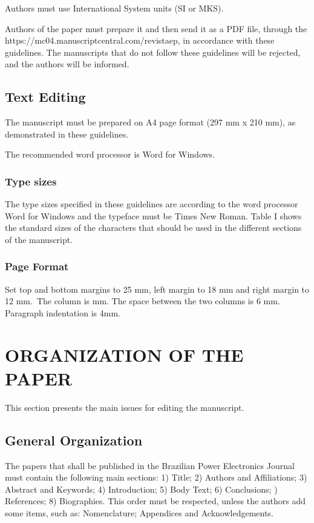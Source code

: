 \documentclass[english]{sobraep}
\begin{document}
Authors must use International System units (SI or MKS).

Authors of the paper must prepare it and then send it as a PDF file, through the https://mc04.manuscriptcentral.com/revistaep, in accordance with these guidelines. The manuscripts that do not follow these guidelines will be rejected, and the authors will be informed.

\subsection{Text Editing}
The manuscript must be prepared on A4 page format \linebreak (297 mm x 210 mm), as demonstrated in these guidelines.

The recommended word processor is Word for Windows.

\subsubsection{Type sizes} The type sizes specified in these guidelines are according to the word processor Word for Windows and the typeface must be Times New Roman. Table I shows the standard sizes of the characters that should be used in the different sections of the manuscript.

\subsubsection{Page Format} Set top and bottom margins to 25 mm, left margin to 18 mm and right margin to 12 mm.~The column is  mm. The space between the two columns is 6 mm. Paragraph indentation is 4mm.

\section{ORGANIZATION OF THE PAPER}

This section presents the main issues for editing the manuscript.

\subsection{General Organization}

The papers that shall be published in the Brazilian Power Electronics Journal must contain the following main sections:
1) Title; 2) Authors and Affiliations; 3) Abstract and Keywords; 4) Introduction; 5) Body Text; 6) Conclusions; ) References; 8) Biographies. This order must be respected, unless the authors add some items, such as: Nomenclature; Appendices and Acknowledgements.
\end{document}
